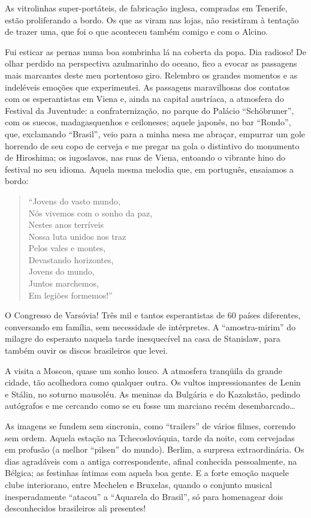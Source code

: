 As vitrolinhas super-portáteis, de fabricação inglesa, compradas em Tenerife, estão proliferando a bordo. Os que as viram nas lojas, não resistiram à tentação de trazer uma, que foi o que aconteceu também comigo e com o Alcino.

Fui esticar as pernas numa boa sombrinha lá na coberta da popa. Dia radioso! De olhar perdido na perspectiva azulmarinho do oceano, fico a evocar as passagens mais marcantes deste meu portentoso giro. Relembro os grandes momentos e as indeléveis emoções que experimentei. As passagens maravilhosas dos contatos com os esperantistas em Viena e, ainda na capital austríaca, a atmosfera do Festival da Juventude: a confraternização, no parque do Palácio ``Schöbruner'', com os suecos, madagasquenhos e ceiloneses; aquele japonês, no bar ``Rondo'', que, exclamando ``Brasil'', veio para a minha mesa me abraçar, empurrar um gole horrendo de seu copo de cerveja e me pregar na gola o distintivo do monumento de Hiroshima; os iugoslavos, nas ruas de Viena, entoando o vibrante hino do festival no seu idioma. Aquela mesma melodia que, em português, ensaiamos a bordo:

\begin{verse}
``Jovens do vasto mundo,\\
Nós vivemos com o sonho da paz,\\
Nestes anos terríveis\\
Nossa luta unidos nos traz\\
Pelos vales e montes,\\
Devastando horizontes,\\
Jovens do mundo,\\
Juntos marchemos,\\
Em legiões formemos!''
\end{verse}

O Congresso de Varsóvia! Três mil e tantos esperantistas de 60 países diferentes, conversando em família, sem necessidade de intérpretes. A ``amostra-mirim'' do milagre do esperanto naquela tarde inesquecível na casa de Stanislaw, para também ouvir os discos brasileiros que levei.

A visita a Moscou, quase um sonho louco. A atmosfera tranqüila da grande cidade, tão acolhedora como qualquer outra. Os vultos impressionantes de Lenin e Stálin, no soturno mausoléu. As meninas da Bulgária e do Kazakstão, pedindo autógrafos e me cercando como se eu fosse um marciano recém desembarcado\ldots

As imagens se fundem sem sincronia, como ``trailers'' de vários filmes, correndo sem ordem. Aquela estação na Tchecoslováquia, tarde da noite, com cervejadas em profusão (a melhor ``pilsen'' do mundo). Berlim, a surpresa extraordinária. Os dias agradáveis com a antiga correspondente, afinal conhecida pessoalmente, na Bélgica; as festinhas íntimas com aquela boa gente. E a forte emoção naquele clube interiorano, entre Mechelen e Bruxelas, quando o conjunto musical inesperadamente ``atacou'' a ``Aquarela do Brasil'', só para homenagear dois desconhecidos brasileiros ali presentes!


